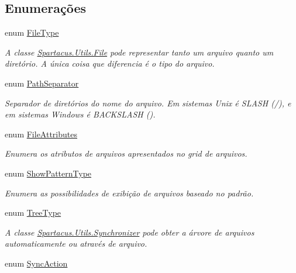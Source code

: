 \subsection*{Enumerações}
\begin{DoxyCompactItemize}
\item 
enum \hyperlink{namespaceSpartacus_1_1Utils_a2bc44488e88db523cb2dcffaa6e77541}{File\+Type} 
\begin{DoxyCompactList}\small\item\em A classe \hyperlink{classSpartacus_1_1Utils_1_1File}{Spartacus.\+Utils.\+File} pode representar tanto um arquivo quanto um diretório. A única coisa que diferencia é o tipo do arquivo. \end{DoxyCompactList}\item 
enum \hyperlink{namespaceSpartacus_1_1Utils_a9ee24558a33d60b42674bae3eed2a094}{Path\+Separator} 
\begin{DoxyCompactList}\small\item\em Separador de diretórios do nome do arquivo. Em sistemas Unix é S\+L\+A\+S\+H (/), e em sistemas Windows é B\+A\+C\+K\+S\+L\+A\+S\+H (). \end{DoxyCompactList}\item 
enum \hyperlink{namespaceSpartacus_1_1Utils_a81ab9f259fbae2db00ea1cd29690a6cf}{File\+Attributes} 
\begin{DoxyCompactList}\small\item\em Enumera os atributos de arquivos apresentados no grid de arquivos. \end{DoxyCompactList}\item 
enum \hyperlink{namespaceSpartacus_1_1Utils_a39dc52f76b36470069f38f3e8b1cd73e}{Show\+Pattern\+Type} 
\begin{DoxyCompactList}\small\item\em Enumera as possibilidades de exibição de arquivos baseado no padrão. \end{DoxyCompactList}\item 
enum \hyperlink{namespaceSpartacus_1_1Utils_ae4b47116ae1dc35f3dc3ea735874beee}{Tree\+Type} 
\begin{DoxyCompactList}\small\item\em A classe \hyperlink{classSpartacus_1_1Utils_1_1Synchronizer}{Spartacus.\+Utils.\+Synchronizer} pode obter a árvore de arquivos automaticamente ou através de arquivo. \end{DoxyCompactList}\item 
enum \hyperlink{namespaceSpartacus_1_1Utils_a835f63b39808393d4b72d203056ae42e}{Sync\+Action} 

\end{DoxyCompactItemize}

